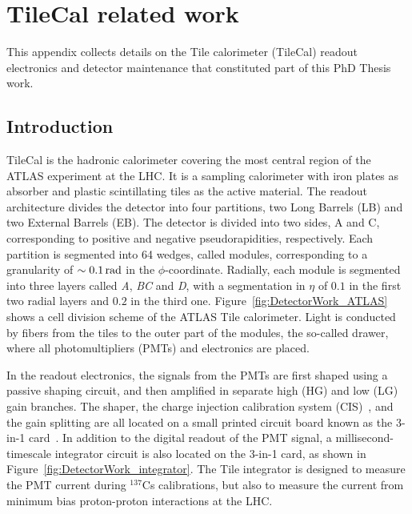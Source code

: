 \chapter{TileCal related work}
    \label{app:DetectorWork}

This appendix collects details on the Tile calorimeter (TileCal) readout electronics and detector maintenance that constituted part of this PhD Thesis work.


\section{Introduction}

TileCal is the hadronic calorimeter covering the most central region of the ATLAS experiment at the LHC.
It is a sampling calorimeter with iron plates as absorber and plastic scintillating tiles as the active material.
The readout architecture divides the detector into four partitions, two Long Barrels (LB) and two External Barrels (EB).
The detector is divided into two sides, A and C, corresponding to positive and negative pseudorapidities, respectively.
Each partition is segmented into 64 wedges, called modules, corresponding to a granularity of $\sim \unit[0.1]{rad}$ in the $\phi$-coordinate. 
Radially, each module is segmented into three layers called \emph{A}, \emph{BC} and \emph{D}, with a segmentation in $\eta$ of $0.1$ in the first two radial layers and $0.2$ in the third one. 
Figure~\ref{fig:DetectorWork_ATLAS} shows a cell division scheme of the ATLAS Tile calorimeter.
Light is conducted by fibers from the tiles to the outer part of the modules, the so-called drawer, where all photomultipliers (PMTs) and electronics are placed. 

In the readout electronics, the signals from the PMTs are first shaped using a passive shaping circuit, and then amplified in separate high (HG) and low (LG) gain branches.
The shaper, the charge injection calibration system (CIS)~\cite{Tang:2013vya}, and the gain splitting are all located on a small printed circuit board known as the 3-in-1 card~\cite{Tang:2013vya}.
In addition to the digital readout of the PMT signal, a millisecond-timescale integrator circuit is also located on the 3-in-1 card, as shown in Figure~\ref{fig:DetectorWork_integrator}.
The Tile integrator is designed to measure the PMT current during $^{137}$Cs calibrations, but also to measure the current from minimum bias proton-proton interactions at the LHC.

